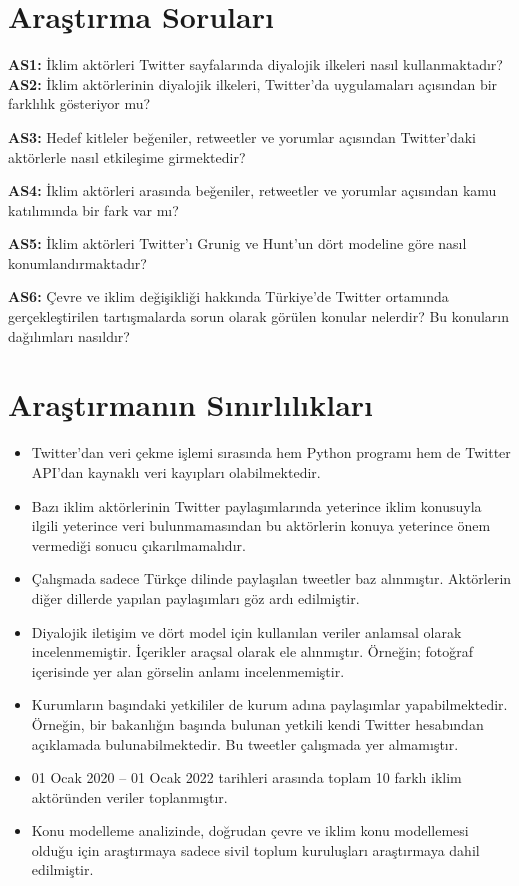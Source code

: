 \documentclass[
]{book}
\begin{document}
\hypertarget{araux15ftux131rma-sorularux131}{%
\section{Araştırma Soruları}\label{araux15ftux131rma-sorularux131}}

\textbf{AS1:} İklim aktörleri Twitter sayfalarında diyalojik ilkeleri nasıl kullanmaktadır?
\textbf{AS2:} İklim aktörlerinin diyalojik ilkeleri, Twitter'da uygulamaları açısından bir
farklılık gösteriyor mu?

\textbf{AS3:} Hedef kitleler beğeniler, retweetler ve yorumlar açısından Twitter'daki aktörlerle nasıl etkileşime girmektedir?

\textbf{AS4:} İklim aktörleri arasında beğeniler, retweetler ve yorumlar açısından kamu katılımında bir fark var mı?

\textbf{AS5:} İklim aktörleri Twitter'ı Grunig ve Hunt'un dört modeline göre nasıl konumlandırmaktadır?

\textbf{AS6:} Çevre ve iklim değişikliği hakkında Türkiye'de Twitter ortamında gerçekleştirilen tartışmalarda sorun olarak görülen konular nelerdir? Bu konuların dağılımları nasıldır?

\hypertarget{araux15ftux131rmanux131n-sux131nux131rlux131lux131klarux131}{%
\section{Araştırmanın Sınırlılıkları}\label{araux15ftux131rmanux131n-sux131nux131rlux131lux131klarux131}}

\begin{itemize}
\item
  Twitter'dan veri çekme işlemi sırasında hem Python programı hem de Twitter API'dan kaynaklı veri kayıpları olabilmektedir.
\item
  Bazı iklim aktörlerinin Twitter paylaşımlarında yeterince iklim konusuyla ilgili yeterince veri bulunmamasından bu aktörlerin konuya yeterince önem vermediği sonucu çıkarılmamalıdır.
\item
  Çalışmada sadece Türkçe dilinde paylaşılan tweetler baz alınmıştır. Aktörlerin diğer dillerde yapılan paylaşımları göz ardı edilmiştir.
\item
  Diyalojik iletişim ve dört model için kullanılan veriler anlamsal olarak incelenmemiştir. İçerikler araçsal olarak ele alınmıştır. Örneğin; fotoğraf içerisinde yer alan görselin anlamı incelenmemiştir.
\item
  Kurumların başındaki yetkililer de kurum adına paylaşımlar yapabilmektedir. Örneğin, bir bakanlığın başında bulunan yetkili kendi Twitter hesabından açıklamada bulunabilmektedir. Bu tweetler çalışmada yer almamıştır.
\item
  01 Ocak 2020 -- 01 Ocak 2022 tarihleri arasında toplam 10 farklı iklim aktöründen veriler toplanmıştır.
\item
  Konu modelleme analizinde, doğrudan çevre ve iklim konu modellemesi olduğu için araştırmaya sadece sivil toplum kuruluşları araştırmaya dahil edilmiştir.
\end{itemize}
\end{document}
